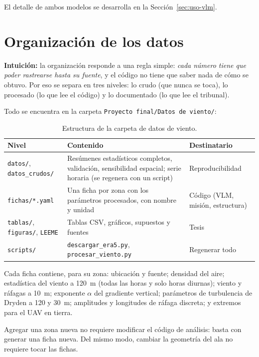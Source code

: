 \documentclass[11pt]{article}
\begin{document}
El detalle de ambos modelos se desarrolla en la
Sección~\ref{sec:uso-vlm}.

\section{Organización de los datos}
\label{sec:organizacion}

\textbf{Intuición:} la organización responde a una regla simple: \emph{cada
número tiene que poder rastrearse hasta su fuente}, y el código no tiene que
saber nada de cómo se obtuvo. Por eso se separa en tres niveles: lo crudo
(que nunca se toca), lo procesado (lo que lee el código) y lo documentado
(lo que lee el tribunal).

Todo se encuentra en la carpeta \texttt{Proyecto final/Datos de viento/}:

\begin{table}[H]
\centering
\begin{tabular}{@{}p{3.6cm}p{6.2cm}p{4.2cm}@{}}
\toprule
Nivel & Contenido & Destinatario \\
\midrule
\texttt{datos/}, \texttt{datos\_crudos/} & Resúmenes estadísticos completos, validación, sensibilidad espacial; serie horaria (se regenera con un script) & Reproducibilidad \\
\texttt{fichas/*.yaml} & Una ficha por zona con los parámetros procesados, con nombre y unidad & Código (VLM, misión, estructura) \\
\texttt{tablas/}, \texttt{figuras/}, \texttt{LEEME} & Tablas CSV, gráficos, supuestos y fuentes & Tesis \\
\texttt{scripts/} & \texttt{descargar\_era5.py}, \texttt{procesar\_viento.py} & Regenerar todo \\
\bottomrule
\end{tabular}
\caption{Estructura de la carpeta de datos de viento.}
\label{tab:carpeta}
\end{table}

Cada ficha contiene, para su zona: ubicación y fuente; densidad del aire;
estadística del viento a 120~m (todas las horas y solo horas diurnas);
viento y ráfagas a 10~m; exponente $\alpha$ del gradiente vertical;
parámetros de turbulencia de Dryden a 120 y 30~m; amplitudes y longitudes de
ráfaga discreta; y extremos para el UAV en tierra.

Agregar una zona nueva no requiere modificar el código de análisis:
basta con generar una ficha nueva. Del mismo modo, cambiar la geometría del
ala no requiere tocar las fichas.
\end{document}
